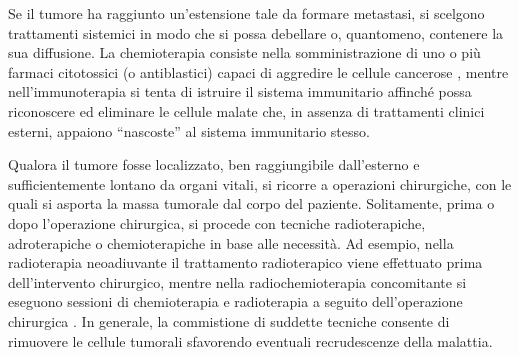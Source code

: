 \documentclass[12pt,a4paper,twoside]{report}
\begin{document}
	Se il tumore ha raggiunto un'estensione tale da formare metastasi, si scelgono trattamenti sistemici in modo che si possa debellare o, quantomeno, contenere la sua diffusione. La chemioterapia consiste nella somministrazione di uno o più farmaci citotossici (o antiblastici) capaci di aggredire le cellule cancerose \cite{aimac1}, mentre nell'immunoterapia si tenta di istruire il sistema immunitario affinché possa riconoscere ed eliminare le cellule malate che, in assenza di trattamenti clinici esterni, appaiono ``nascoste'' al sistema immunitario stesso.
	
	Qualora il tumore fosse localizzato, ben raggiungibile dall'esterno e sufficientemente lontano da organi vitali, si ricorre a operazioni chirurgiche, con le quali si asporta la massa tumorale dal corpo del paziente. Solitamente, prima o dopo l'operazione chirurgica, si procede con tecniche radioterapiche, adroterapiche o chemioterapiche in base alle necessità. Ad esempio, nella radioterapia neoadiuvante il trattamento radioterapico viene effettuato prima dell'intervento chirurgico, mentre nella radiochemioterapia concomitante si eseguono sessioni di chemioterapia e radioterapia a seguito dell'operazione chirurgica \cite{aimac2}. In generale, la commistione di suddette tecniche consente di rimuovere le cellule tumorali sfavorendo eventuali recrudescenze della malattia.
	
\end{document}
